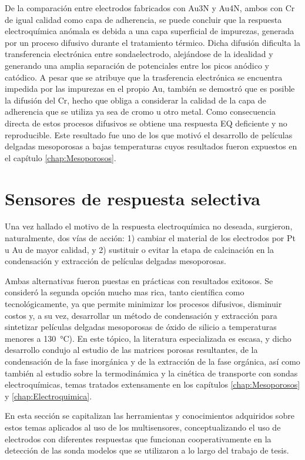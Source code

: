 		    De la comparación entre electrodos fabricados con Au3N y Au4N, ambos con Cr de igual calidad como capa de adherencia, se puede concluir que la respuesta electroquímica anómala es debida a una capa superficial de impurezas, generada por un proceso difusivo durante el tratamiento térmico. Dicha difusión dificulta la transferencia electrónica entre sonda\textbar electrodo, alejándose de la idealidad y generando una amplia separación de potenciales entre los picos anódico y catódico. A pesar que se atribuye que la trasferencia electrónica se encuentra impedida por las impurezas en el propio Au, también se demostró que es posible la difusión del Cr, hecho que obliga a considerar la calidad de la capa de adherencia que se utiliza ya sea de cromo u otro metal. Como consecuencia directa de estos procesos difusivos se obtiene una respuesta EQ deficiente y no reproducible. Este resultado fue uno de los que motivó el desarrollo de películas delgadas mesoporosas a bajas temperaturas cuyos resultados fueron expuestos en el capítulo \ref{chap:Mesoporosos}.

\section{Sensores de respuesta selectiva}

	Una vez hallado el motivo de la respuesta electroquímica no deseada, surgieron, naturalmente, dos vías de acción: 1) cambiar el material de los electrodos por Pt u Au de mayor calidad, y 2) sustituir o evitar la etapa de calcinación en la condensación y extracción de películas delgadas mesoporosas.

	Ambas alternativas fueron puestas en prácticas con resultados exitosos. Se consideró la segunda opción mucho mas rica, tanto científica como tecnológicamente, ya que permite minimizar los procesos difusivos, disminuir costos y, a su vez, desarrollar un método de condensación y extracción para sintetizar películas delgadas mesoporosas de óxido de silicio a temperaturas menores a \SI{130}{\celsius}). En este tópico, la literatura especializada es escasa, y dicho desarrollo condujo al estudio de las matrices porosas resultantes, de la condensación de la fase inorgánica y de la extracción de la fase orgánica, así como también al estudio sobre la termodinámica y la cinética de transporte con sondas electroquímicas, temas tratados extensamente en los capítulos  \ref{chap:Mesoporosos} y \ref{chap:Electroquimica}. 

    En esta sección se capitalizan las herramientas y conocimientos adquiridos sobre estos temas aplicados al uso de los multisensores, conceptualizando el uso de electrodos con diferentes respuestas que funcionan cooperativamente en la detección de las sonda modelos que se utilizaron a lo largo del trabajo de tesis. 

